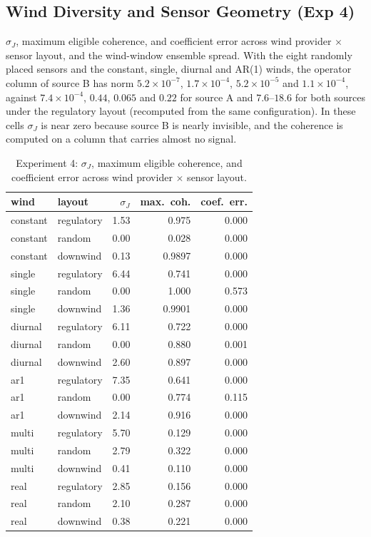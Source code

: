 \subsection{Wind Diversity and Sensor Geometry (Exp 4)}
$\sigma_J$, maximum eligible coherence, and coefficient error across wind provider
$\times$ sensor layout, and the wind-window ensemble spread.  With the eight randomly
placed sensors and the constant, single, diurnal and AR(1) winds, the operator column
of source B has norm $5.2\times10^{-7}$, $1.7\times10^{-4}$, $5.2\times10^{-5}$ and
$1.1\times10^{-4}$, against $7.4\times10^{-4}$, $0.44$, $0.065$ and $0.22$ for
source A and $7.6$--$18.6$ for both sources under the regulatory layout (recomputed
from the same configuration).  In these cells $\sigma_J$ is near zero because source B
is nearly invisible, and the coherence is computed on a column that carries almost no
signal.
\begin{table}[t]
\centering
\footnotesize
\caption{Experiment 4: $\sigma_J$, maximum eligible coherence, and coefficient
error across wind provider $\times$ sensor layout.}
\label{tab:results_h4}
\begin{tabular}{llrrr}
\toprule
wind & layout & $\sigma_J$ & max.\ coh. & coef.\ err. \\
\midrule
constant & regulatory & 1.53 & 0.975 & 0.000 \\
constant & random     & 0.00 & 0.028 & 0.000 \\
constant & downwind   & 0.13 & 0.9897 & 0.000 \\
single   & regulatory & 6.44 & 0.741 & 0.000 \\
single   & random     & 0.00 & 1.000 & 0.573 \\
single   & downwind   & 1.36 & 0.9901 & 0.000 \\
diurnal  & regulatory & 6.11 & 0.722 & 0.000 \\
diurnal  & random     & 0.00 & 0.880 & 0.001 \\
diurnal  & downwind   & 2.60 & 0.897 & 0.000 \\
ar1      & regulatory & 7.35 & 0.641 & 0.000 \\
ar1      & random     & 0.00 & 0.774 & 0.115 \\
ar1      & downwind   & 2.14 & 0.916 & 0.000 \\
multi    & regulatory & 5.70 & 0.129 & 0.000 \\
multi    & random     & 2.79 & 0.322 & 0.000 \\
multi    & downwind   & 0.41 & 0.110 & 0.000 \\
real     & regulatory & 2.85 & 0.156 & 0.000 \\
real     & random     & 2.10 & 0.287 & 0.000 \\
real     & downwind   & 0.38 & 0.221 & 0.000 \\
\bottomrule
\end{tabular}
\end{table}
